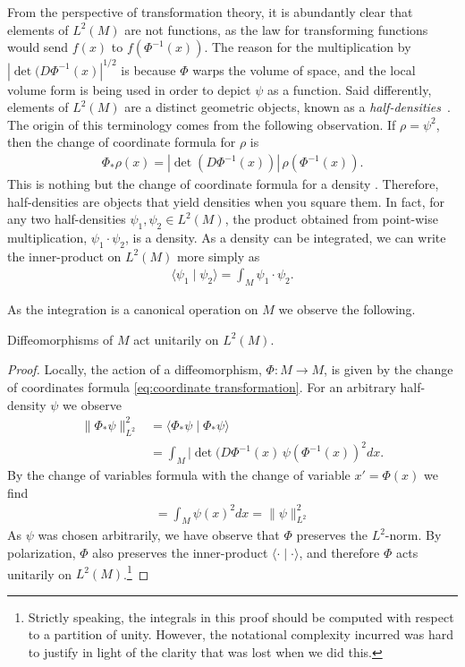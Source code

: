 \documentclass[final,leqno]{siamart}
\begin{document}
From the perspective of transformation theory, it is abundantly clear that elements of $L^2(M)$ are not functions,
as the law for transforming functions would send $f(x)$ to $f( \Phi^{-1}(x))$.
The reason for the multiplication by $| \det( D\Phi^{-1}(x) |^{1/2}$ is because $\Phi$ warps the volume of space, and the local volume form is being used in order to depict $\psi$ as a function.
Said differently, elements of $L^2(M)$ are a distinct geometric objects, known as a \emph{half-densities}~\cite{BatesWeinstein1997,GuilleminSternberg1970}.
The origin of this terminology comes from the following observation.  If $\rho = \psi^2$, then the change of coordinate formula for $\rho$ is
\begin{align*}
	\Phi_*\rho(x) = | \det( D\Phi^{-1}(x)) | \, \rho( \Phi^{-1}(x) ).
\end{align*}
This is nothing but the change of coordinate formula for a density \cite{Lee2006}.
Therefore, half-densities are objects that yield densities when you square them.
In fact, for any two half-densities $\psi_1, \psi_2 \in L^2(M)$, the product obtained from point-wise multiplication, $\psi_1 \cdot \psi_2$,  is a density.
As a density can be integrated, we can write the inner-product on $L^2(M)$ more simply as
\begin{align*}
	\langle \psi_1 \mid \psi_2 \rangle = \int_M \psi_1 \cdot \psi_2.
\end{align*}

As the integration is a canonical operation on $M$ we observe the following.
\begin{proposition} \label{prop:unitary 1}
	Diffeomorphisms of $M$ act unitarily on $L^2(M)$.
\end{proposition}
\begin{proof}
	Locally, the action of a diffeomorphism, $\Phi: M \to M$, is given by the change of coordinates formula \eqref{eq:coordinate transformation}.
	For an arbitrary half-density $\psi$ we observe
	\begin{align*}
		\| \Phi_* \psi \|_{L^2}^2 &= \langle \Phi_* \psi \mid \Phi_* \psi \rangle \\
		&= \int_M | \det( D\Phi^{-1}(x) \, \psi( \Phi^{-1}(x) )^2 dx.
	\end{align*}
	By the change of variables formula with the change of variable $x' = \Phi(x)$ we find
	\begin{align*}
		= \int_M \psi(x )^2 dx = \| \psi \|_{L^2}^2
	\end{align*}
	As $\psi$ was chosen arbitrarily, we have observe that $\Phi$ preserves the $L^2$-norm.
	By polarization, $\Phi$ also preserves the inner-product $\langle \cdot \mid \cdot \rangle$,
	and therefore $\Phi$ acts unitarily on $L^2(M)$.\footnote{Strictly speaking, the integrals in this proof should be computed with respect to a partition of unity.  However, the notational complexity incurred was hard to justify in light of the clarity that was lost when we did this.}
\end{proof}
\end{document}

